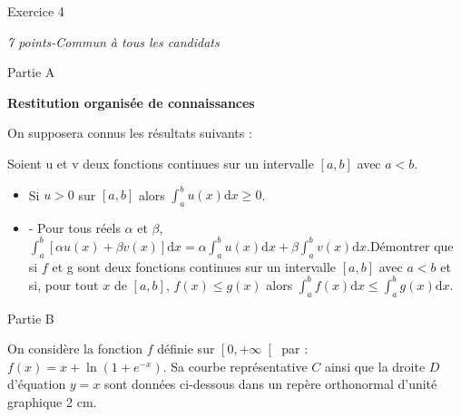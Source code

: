 
%
\begin{h2}Exercice 4\end{h2}
\textit{7 points-Commun à tous les candidats}
\begin{h3}Partie A\end{h3}
\textbf{Restitution organisée de connaissances}
\par
On supposera connus les résultats suivants :
\par
Soient u et v deux fonctions continues sur un intervalle $\left[a, b\right]$ avec $a < b$.

\begin{itemize}
\item
Si $u > 0$ sur $\left[a, b\right]$ alors $\int_{a}^{b} u\left(x\right)\text{d}x \geqslant 0$.
\item
- Pour tous réels $\alpha $ et $\beta $, $\int_{a}^{b} \left[\alpha  u\left(x\right)+\beta  v\left(x\right)\right] \text{d}x=\alpha   \int_{a}^{b} u\left(x\right) \text{d}x+\beta   \int_{a}^{b} v\left(x\right) \text{d}x.$Démontrer que si $f$ et g sont deux fonctions continues sur un intervalle $\left[a, b\right]$ avec $a < b$ et si, pour tout $x$ de $\left[a, b\right]$, $f\left(x\right) \leqslant g\left(x\right)$ alors $\int_{a}^{b} f\left(x\right) \text{d}x \leqslant  \int_{a}^{b} g\left(x\right) \text{d}x$.

\end{itemize}
\begin{h3}Partie B\end{h3}
On considère la fonction $f$ définie sur $\left[0, +\infty \right[$ par : $f\left(x\right)=x+\ln\left(1+e^{-x}\right)$. Sa courbe représentative $C$ ainsi que la droite $D$ d'équation $y=x$ sont données ci-dessous dans un repère orthonormal d'unité graphique 2 cm.

